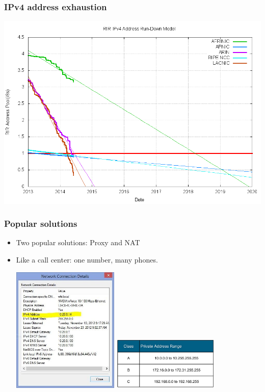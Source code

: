 \documentclass[12pt,leqno,fleqn]{beamer}
\begin{document}

\begin{frame}
\frametitle{IPv4 address exhaustion}
\includegraphics[keepaspectratio=true,width=1\textwidth]{ipv4_stat.png}
\end{frame}


\begin{frame}
\frametitle{Popular solutions}
\begin{itemize}
\item Two popular solutions: Proxy and NAT
\item Like a call center: one number, many phones.

\vspace{8mm}
\includegraphics[keepaspectratio=true, width=0.4\textwidth]{image5.jpeg}
\hspace{8mm}
\includegraphics[keepaspectratio=true, width=0.4\textwidth]{image6.jpeg}

\end{itemize}
\end{frame}
\end{document}
